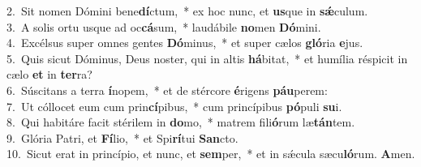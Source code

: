 {2.~}Sit nomen Dómini bene\textbf{dí}ctum,~* ex hoc nunc, et \textbf{us}que in \textbf{sǽ}culum.\\
{3.~}A solis ortu usque ad oc\textbf{cá}sum,~* laudábile \textbf{no}men \textbf{Dó}mini.\\
{4.~}Excélsus super omnes gentes \textbf{Dó}minus,~* et super cælos \textbf{gló}ria \textbf{e}jus.\\
{5.~}Quis sicut Dóminus, Deus noster, qui in altis \textbf{há}bitat,~* et humília réspicit in cælo \textbf{et} in \textbf{ter}ra?\\
{6.~}Súscitans a terra \textbf{í}nopem,~* et de stércore \textbf{é}rigens \textbf{páu}perem:\\
{7.~}Ut cóllocet eum cum prin\textbf{cí}pibus,~* cum princípibus \textbf{pó}puli \textbf{su}i.\\
{8.~}Qui habitáre facit stérilem in \textbf{do}mo,~* matrem fili\textbf{ó}rum læ\textbf{tán}tem.\\
{9.~}Glória Patri, et \textbf{Fí}lio,~* et Spi\textbf{rí}tui \textbf{San}cto.\\
{10.~}Sicut erat in princípio, et nunc, et \textbf{sem}per,~* et in sǽcula sæcu\textbf{ló}rum. \textbf{A}men.\\
